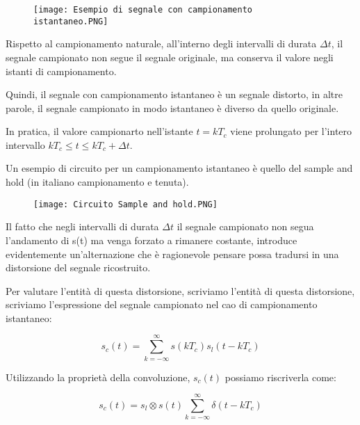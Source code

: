 \begin{figure}[h]
    \centering
    \texttt{[image: Esempio di segnale con campionamento istantaneo.PNG]}
\end{figure}  

Rispetto al campionamento naturale, all'interno degli intervalli di durata $\Delta t$, 
il segnale campionato non segue il segnale originale, ma conserva il valore negli istanti di campionamento. \newline 

Quindi, il segnale con campionamento istantaneo è un segnale distorto, in altre parole, il segnale 
campionato in modo istantaneo è diverso da quello originale. \newline 

In pratica, il valore campionarto nell'istante $t = kT_c$ viene prolungato per l'intero intervallo $kT_c \leq t \leq kT_c + \Delta t$. \newline 

Un esempio di circuito per un campionamento istantaneo è quello del sample and hold (in italiano campionamento e tenuta). 

\begin{figure}[h]
    \centering
    \texttt{[image: Circuito Sample and hold.PNG]}
\end{figure} 

Il fatto che negli intervalli di durata $\Delta t$ il segnale campionato non segua l'andamento di s(t) ma venga forzato a rimanere costante, introduce evidentemente 
un'alternazione che è ragionevole pensare possa tradursi in una distorsione del segnale ricostruito. \newline 

Per valutare l'entità di questa distorsione, scriviamo l'entità di questa distorsione, scriviamo l'espressione del segnale campionato nel cao di campionamento istantaneo: 

{
    \Large 
    \begin{equation}
        s_c (t) 
        = 
        \sum_{k = - \infty}^{\infty}
        s(kT_c) 
        s_l (t-kT_c)
    \end{equation}
} 

Utilizzando la proprietà della convoluzione, $s_c (t)$ possiamo riscriverla come: 

{
    \Large 
    \begin{equation}
        s_c (t) = s_l \otimes s(t) \sum_{k = -\infty}^{\infty} \delta (t - k T_c)
    \end{equation}
}

